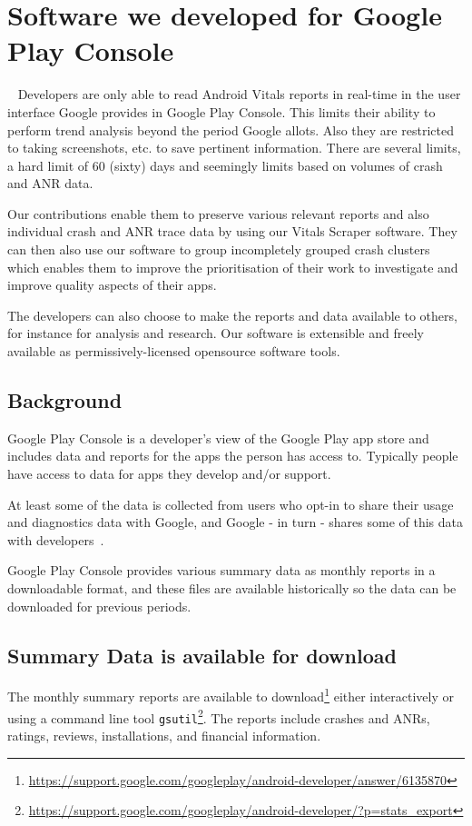 \section{Software we developed for Google Play Console}~\label{sec:software-we-developed-for-google-play-console}
Developers are only able to read Android Vitals reports in real-time in the user interface Google provides in Google Play Console. This limits their ability to perform trend analysis beyond the period Google allots. Also they are restricted to taking screenshots, etc. to save pertinent information. There are several limits, a hard limit of 60 (sixty) days and seemingly limits based on volumes of crash and ANR data. 

Our contributions enable them to preserve various relevant reports and also individual crash and ANR trace data by using our Vitals Scraper software. They can then also use our software to group incompletely grouped crash clusters which enables them to improve the prioritisation of their work to investigate and improve quality aspects of their apps.

The developers can also choose to make the reports and data available to others, for instance for analysis and research. Our software is extensible and freely available as permissively-licensed opensource software tools. 

\subsection{Background}
Google Play Console is a developer's view of the Google Play app store and includes data and reports for the apps the person has access to. Typically people have access to data for apps they develop and/or support.

At least some of the data is collected from users who opt-in to share their usage and diagnostics data with Google, and Google - in turn - shares some of this data with developers~\cite{google_play_share_usage_and_diagnostics_info_with_google}.

Google Play Console provides various summary data as monthly reports in a downloadable format, and these files are available historically so the data can be downloaded for previous periods. 

\subsection{Summary Data is available for download}
The monthly summary reports are available to download\footnote{\url{https://support.google.com/googleplay/android-developer/answer/6135870}} either interactively or using a command line tool \texttt{gsutil}\footnote{\url{https://support.google.com/googleplay/android-developer/?p=stats\_export}}. The reports include crashes and ANRs, ratings, reviews, installations, and financial information. 

